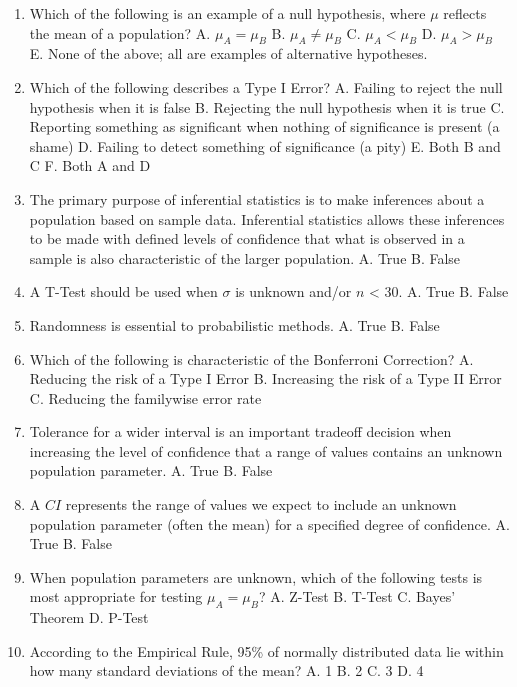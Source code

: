 \documentclass[]{book}
\begin{document}
\begin{enumerate}
\def\labelenumi{\arabic{enumi}.}
\item
  Which of the following is an example of a null hypothesis, where \(\mu\) reflects the mean of a population?
  A. \(\mu_A = \mu_B\)
  B. \(\mu_A \neq \mu_B\)
  C. \(\mu_A < \mu_B\)
  D. \(\mu_A > \mu_B\)
  E. None of the above; all are examples of alternative hypotheses.
\item
  Which of the following describes a Type I Error?
  A. Failing to reject the null hypothesis when it is false
  B. Rejecting the null hypothesis when it is true
  C. Reporting something as significant when nothing of significance is present (a shame)
  D. Failing to detect something of significance (a pity)
  E. Both B and C
  F. Both A and D
\item
  The primary purpose of inferential statistics is to make inferences about a population based on sample data. Inferential statistics allows these inferences to be made with defined levels of confidence that what is observed in a sample is also characteristic of the larger population.
  A. True
  B. False
\item
  A T-Test should be used when \(\sigma\) is unknown and/or \(n\) \textless{} 30.
  A. True
  B. False
\item
  Randomness is essential to probabilistic methods.
  A. True
  B. False
\item
  Which of the following is characteristic of the Bonferroni Correction?
  A. Reducing the risk of a Type I Error
  B. Increasing the risk of a Type II Error
  C. Reducing the familywise error rate
\item
  Tolerance for a wider interval is an important tradeoff decision when increasing the level of confidence that a range of values contains an unknown population parameter.
  A. True
  B. False
\item
  A \(CI\) represents the range of values we expect to include an unknown population parameter (often the mean) for a specified degree of confidence.
  A. True
  B. False
\item
  When population parameters are unknown, which of the following tests is most appropriate for testing \(\mu_A = \mu_B\)?
  A. Z-Test
  B. T-Test
  C. Bayes' Theorem
  D. P-Test
\item
  According to the Empirical Rule, 95\% of normally distributed data lie within how many standard deviations of the mean?
  A. 1
  B. 2
  C. 3
  D. 4
\end{enumerate}
\end{document}
